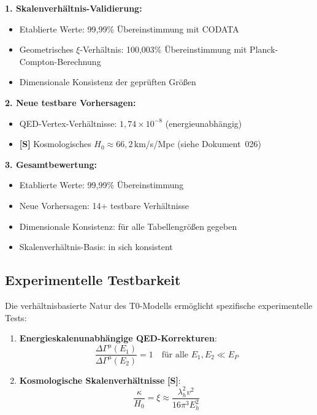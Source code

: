 	\begin{tcolorbox}[colback=green!5!white,colframe=green!75!black,title=Hauptergebnisse der T0-Verifikation]
		\textbf{1. Skalenverhältnis-Validierung:}
		\begin{itemize}
			\item Etablierte Werte: 99,99\% Übereinstimmung mit CODATA
			\item Geometrisches $\xi$-Verhältnis: 100,003\% Übereinstimmung mit Planck-Compton-Berechnung
			\item Dimensionale Konsistenz der geprüften Größen
		\end{itemize}
		
		\textbf{2. Neue testbare Vorhersagen:}
		\begin{itemize}
			\item QED-Vertex-Verhältnisse: $1,74 \times 10^{-8}$ (energieunabhängig)
			\item \textbf{[S]} Kosmologisches $H_0 \approx 66{,}2\,$km/s/Mpc (siehe Dokument~026)
		\end{itemize}
		
		\textbf{3. Gesamtbewertung:}
		\begin{itemize}
			\item Etablierte Werte: 99,99\% Übereinstimmung
			\item Neue Vorhersagen: 14+ testbare Verhältnisse
			\item Dimensionale Konsistenz: für alle Tabellengrößen gegeben
			\item Skalenverhältnis-Basis: in sich konsistent
		\end{itemize}
	\end{tcolorbox}
	
	\subsection{Experimentelle Testbarkeit}
	
	Die verhältnisbasierte Natur des T0-Modells ermöglicht spezifische experimentelle Tests:
	
	\begin{enumerate}
		\item \textbf{Energieskalenunabhängige QED-Korrekturen}:
		\begin{equation}
			\frac{\Delta\Gamma^{\mu}(E_1)}{\Delta\Gamma^{\mu}(E_2)} = 1 \quad \text{für alle } E_1, E_2 \ll E_P
		\end{equation}
		
		\item \textbf{Kosmologische Skalenverhältnisse} \textbf{[S]}:
		\begin{equation}
			\frac{\kappa}{H_0} = \xi \approx \frac{\lambda_h^2 v^2}{16\pi^3 E_h^2}
		\end{equation}
	\end{enumerate}
	
